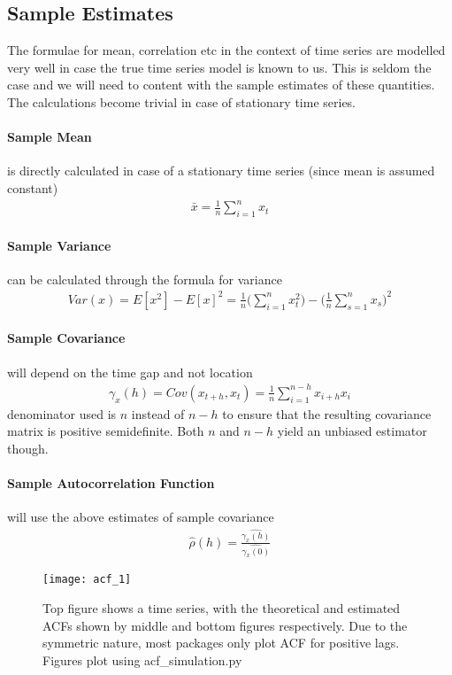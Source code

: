 \documentclass[../../time_series_notes.tex]{subfiles}
\begin{document}
\subsection{Sample Estimates}
The formulae for mean, correlation etc in the context of time series are modelled very well in case the true time series model is known to us. This is seldom the case and we will need to content with the sample estimates of these quantities. The calculations become trivial in case of stationary time series.

\paragraph{Sample Mean} is directly calculated in case of a stationary time series (since mean is assumed constant)
\begin{align*}
    \bar{x} = \frac{1}{n} \sum_{i=1}^{n} x_{t}
\end{align*}
\paragraph{Sample Variance} can be calculated through the formula for variance
\begin{align*}
    Var(x) = E[x^{2}] - E[x]^{2} = \frac{1}{n} \bigg( \sum_{i=1}^{n} x_{t}^{2} \bigg) - \bigg( \frac{1}{n}\sum_{s=1}^{n}x_{s} \bigg)^{2}
\end{align*}
\paragraph{Sample Covariance} will depend on the time gap and not location
\begin{align*}
    \gamma_{x}(h) = Cov(x_{t+h},x_{t}) = \frac{1}{n}\sum_{i=1}^{n-h}x_{i+h}x_{i}
\end{align*}
denominator used is $n$ instead of $n-h$ to ensure that the resulting covariance matrix is positive semidefinite. Both $n$ and $n-h$ yield an unbiased estimator though.
\paragraph{Sample Autocorrelation Function} will use the above estimates of sample covariance
\begin{align*}
    \hat{\rho}(h) = \frac{\hat{\gamma_{x}(h)}}{\hat{\gamma_{x}(0)}}
\end{align*}


\begin{figure}[h]
    \texttt{[image: acf\_1]}
    \centering
    \caption {Top figure shows a time series, with the theoretical and estimated ACFs shown by middle and bottom figures respectively. Due to the symmetric nature, most packages only plot ACF for positive lags. Figures plot using acf\_simulation.py}
    \label{fig:acf_1} %
\end{figure}
\end{document}
